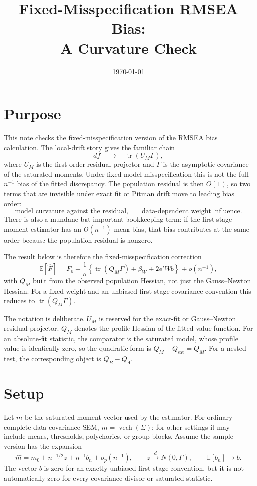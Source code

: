 \documentclass[11pt]{article}
\title{Fixed-Misspecification RMSEA Bias:\\A Curvature Check}
\author{}
\date{\today}
\newcommand{\E}{\mathbb{E}}
\newcommand{\tr}{\operatorname{tr}}
\newcommand{\dto}{\xrightarrow{d}}
\theoremstyle{plain}
\theoremstyle{remark}
\begin{document}
\maketitle

\section*{Purpose}

This note checks the fixed-misspecification version of the RMSEA bias
calculation. The local-drift story gives the familiar chain
\[
  df \quad\longrightarrow\quad \tr(U_M\Gamma),
\]
where $U_M$ is the first-order residual projector and $\Gamma$ is the asymptotic
covariance of the saturated moments. Under fixed model misspecification this is
not the full $n^{-1}$ bias of the fitted discrepancy. The population residual is
then $O(1)$, so two terms that are invisible under exact fit or Pitman drift move
to leading bias order:
\[
  \text{model curvature against the residual,}
  \qquad
  \text{data-dependent weight influence.}
\]
There is also a mundane but important bookkeeping term: if the first-stage
moment estimator has an $O(n^{-1})$ mean bias, that bias contributes at the same
order because the population residual is nonzero.

The result below is therefore the fixed-misspecification correction
\[
  \E[\hat F]
  =
  F_0
  +
  \frac{1}{n}
  \left\{
    \tr(Q_M\Gamma)
    + \beta_W
    + 2 e'W b
  \right\}
  + o(n^{-1}),
\]
with $Q_M$ built from the observed population Hessian, not just the
Gauss--Newton Hessian. For a fixed weight and an unbiased first-stage covariance
convention this reduces to $\tr(Q_M\Gamma)$.

The notation is deliberate. $U_M$ is reserved for the exact-fit or
Gauss--Newton residual projector. $Q_M$ denotes the profile Hessian of the
fitted value function. For an absolute-fit statistic, the comparator is the
saturated model, whose profile value is identically zero, so the quadratic form
is $Q_M-Q_{\mathrm{sat}}=Q_M$. For a nested test, the corresponding object is
$Q_B-Q_A$.

\section{Setup}

Let $m$ be the saturated moment vector used by the estimator. For ordinary
complete-data covariance SEM, $m=\operatorname{vech}(\Sigma)$; for other
settings it may include means, thresholds, polychorics, or group blocks. Assume
the sample version has the expansion
\begin{equation}\label{eq:mexp}
  \hat m
  =
  m_0 + n^{-1/2} z + n^{-1} b_n + o_p(n^{-1}),
  \qquad
  z\dto N(0,\Gamma),
  \qquad
  \E[b_n]\to b .
\end{equation}
The vector $b$ is zero for an exactly unbiased first-stage convention, but it is
not automatically zero for every covariance divisor or saturated statistic.
\end{document}
